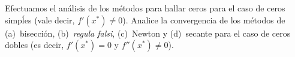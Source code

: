 \documentclass[spanish, fleqn]{article}
\title{Tarea \num\\
       \large Algoritmos y Complejidad\\[3ex]
       \emph{\textquote{La curiosidad mató al gato\ldots}}}
\author{Algorithm Knaves}
\date{2018-09-11}
\begin{document}
\maketitle

  Efectuamos el análisis de los métodos para hallar ceros
  para el caso de ceros simpĺes
  (vale decir,
   \(f'(x^*) \ne 0\)).
  Analice la convergencia de los métodos de (a)~bisección,
  (b)~\emph{\foreignlanguage{latin}{regula falsi}},
  (c)~Newton
  y (d)~secante
  para el caso de ceros dobles
  (es decir,
   \(f'(x^*) = 0\) y \(f''(x^*) \ne 0\)).


\end{document}
